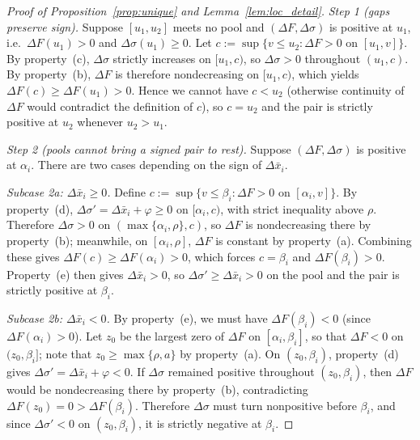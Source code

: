 \documentclass[12pt]{article}
\theoremstyle{mystyle}
\theoremstyle{mystyle2}
\newcommand{\1}{\mathbf{1}}
\begin{document}
\begin{proof}[Proof of Proposition~\ref{prop:unique} and Lemma~\ref{lem:loc_detail}]
\emph{Step 1 (gaps preserve sign).} Suppose $[u_1,u_2]$ meets no pool and $(\Delta F,\Delta\sigma)$ is positive at $u_1$, i.e.\ $\Delta F(u_1)>0$ and $\Delta\sigma(u_1)\ge 0$. Let $c:=\sup\{v\le u_2:\Delta F>0\text{ on }[u_1,v]\}$. By property~(c), $\Delta\sigma$ strictly increases on $[u_1,c)$, so $\Delta\sigma>0$ throughout $(u_1,c)$. By property~(b), $\Delta F$ is therefore nondecreasing on $[u_1,c)$, which yields $\Delta F(c)\ge\Delta F(u_1)>0$. Hence we cannot have $c<u_2$ (otherwise continuity of $\Delta F$ would contradict the definition of $c$), so $c=u_2$ and the pair is strictly positive at $u_2$ whenever $u_2>u_1$.

\emph{Step 2 (pools cannot bring a signed pair to rest).} Suppose $(\Delta F,\Delta\sigma)$ is positive at $\alpha_i$. There are two cases depending on the sign of $\Delta\bar x_i$.

\emph{Subcase 2a: $\Delta\bar x_i\ge 0$.} Define $c:=\sup\{v\le\beta_i:\Delta F>0\text{ on }[\alpha_i,v]\}$. By property~(d), $\Delta\sigma'=\Delta\bar x_i+\varphi\ge 0$ on $[\alpha_i,c)$, with strict inequality above $\rho$. Therefore $\Delta\sigma>0$ on $(\max\{\alpha_i,\rho\},c)$, so $\Delta F$ is nondecreasing there by property~(b); meanwhile, on $[\alpha_i,\rho]$, $\Delta F$ is constant by property~(a). Combining these gives $\Delta F(c)\ge\Delta F(\alpha_i)>0$, which forces $c=\beta_i$ and $\Delta F(\beta_i)>0$. Property~(e) then gives $\Delta\bar x_i>0$, so $\Delta\sigma'\ge\Delta\bar x_i>0$ on the pool and the pair is strictly positive at $\beta_i$.

\emph{Subcase 2b: $\Delta\bar x_i<0$.} By property~(e), we must have $\Delta F(\beta_i)<0$ (since $\Delta F(\alpha_i)>0$). Let $z_0$ be the largest zero of $\Delta F$ on $[\alpha_i,\beta_i]$, so that $\Delta F<0$ on $(z_0,\beta_i]$; note that $z_0\ge\max\{\rho,a\}$ by property~(a). On $(z_0,\beta_i)$, property~(d) gives $\Delta\sigma'=\Delta\bar x_i+\varphi<0$. If $\Delta\sigma$ remained positive throughout $(z_0,\beta_i)$, then $\Delta F$ would be nondecreasing there by property~(b), contradicting $\Delta F(z_0)=0>\Delta F(\beta_i)$. Therefore $\Delta\sigma$ must turn nonpositive before $\beta_i$, and since $\Delta\sigma'<0$ on $(z_0,\beta_i)$, it is strictly negative at $\beta_i$.


\end{proof}
\end{document}
